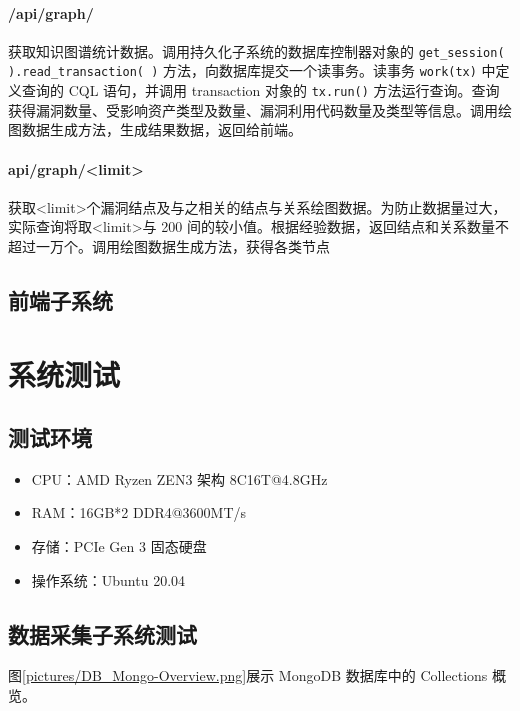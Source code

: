 \documentclass[a4paper,AutoFakeBold,oneside,12pt]{book}
\begin{document}
\subsubsection{/api/graph/}

获取知识图谱统计数据。调用持久化子系统的数据库控制器对象的 \lstinline|get_session( ).read_transaction( )| 方法，向数据库提交一个读事务。读事务 \lstinline|work(tx)| 中定义查询的 CQL 语句，并调用 transaction 对象的 \lstinline|tx.run()| 方法运行查询。查询获得漏洞数量、受影响资产类型及数量、漏洞利用代码数量及类型等信息。调用绘图数据生成方法，生成结果数据，返回给前端。

\subsubsection{api/graph/<limit>}

获取<limit>个漏洞结点及与之相关的结点与关系绘图数据。为防止数据量过大，实际查询将取<limit>与 200 间的较小值。根据经验数据，返回结点和关系数量不超过一万个。调用绘图数据生成方法，获得各类节点

\section{前端子系统}

\chapter{系统测试}

\section{测试环境}

\begin{itemize}
	\item CPU：AMD Ryzen ZEN3 架构 8C16T@4.8GHz
	\item RAM：16GB*2 DDR4@3600MT/s
	\item 存储：PCIe Gen 3 固态硬盘
	\item 操作系统：Ubuntu 20.04
\end{itemize}

\section{数据采集子系统测试}

图\ref{pictures/DB_Mongo-Overview.png}展示 MongoDB 数据库中的 Collections 概览。

\end{document}
